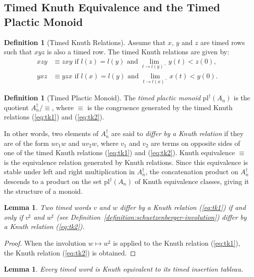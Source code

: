 \documentclass[10pt]{amsproc}
\newtheorem{lemma}[theorem]{Lemma}
\theoremstyle{definition}
\newtheorem{definition}[theorem]{Definition}
\theoremstyle{remark}
\newcommand{\pl}{\mathrm{pl}}
\begin{document}
\subsection{Timed Knuth Equivalence and the Timed Plactic Monoid}
\begin{definition}
  [Timed Knuth Relations]
  \label{sec:timed-knuth-equiv}
  Assume that $x$, $y$ and $z$ are timed rows such that $xyz$ is also a timed row.
  The timed Knuth relations are given by:
  \begin{align}
    \tag{$\kappa_1$}
    \label{eq:tk1}
    xzy & \equiv zxy \text{ if } l(z)=l(y) \text{ and } \lim_{t\to l(y)^-} y(t)<z(0),\\
    \tag{$\kappa_2$}
    \label{eq:tk2}
    yxz & \equiv yzx\text{ if } l(x)=l(y) \text{ and } \lim_{t\to l(x)^-} x(t)<y(0).
  \end{align}
\end{definition}
\begin{definition}
  [Timed Plactic Monoid]
  \label{definition:timed-plactic-monoid}
  The \emph{timed plactic monoid} $\pl^\dagger(A_n)$ is the quotient $A_n^\dagger/\equiv$, where $\equiv$ is the congruence generated by the timed Knuth relations (\ref{eq:tk1}) and (\ref{eq:tk2}).
\end{definition}
In other words, two elements of $A_n^\dagger$ are said to \emph{differ by a Knuth relation} if they are of the form $uv_1w$ and $uv_2w$, where $v_1$ and $v_2$ are terms on opposite sides of one of the timed Knuth relations (\ref{eq:tk1}) and (\ref{eq:tk2}).
Knuth equivalence $\equiv$ is the equivalence relation generated by Knuth relations.
Since this equivalence is stable under left and right multiplication in $A_n^\dagger$, the concatenation product on $A_n^\dagger$ descends to a product on the set $\pl^\dagger(A_n)$ of Knuth equivalence classes, giving it the structure of a monoid.
\begin{lemma}
  \label{lemma:sharp-moves}
  Two timed words $v$ and $w$ differ by a Knuth relation (\ref{eq:tk1}) if and only if $v^\sharp$ and $w^\sharp$ (see Definition~\ref{definition:schuetzenberger-involution}) differ by a Knuth relation (\ref{eq:tk2}).
\end{lemma}
\begin{proof}
  When the involution $w\mapsto w^\sharp$ is applied to the Knuth relation (\ref{eq:tk1}), the Knuth relation (\ref{eq:tk2}) is obtained.
\end{proof}
\begin{lemma}
  \label{lemma:reduction-to-tab}
  Every timed word is Knuth equivalent to its timed insertion tableau.
\end{lemma}
\end{document}
